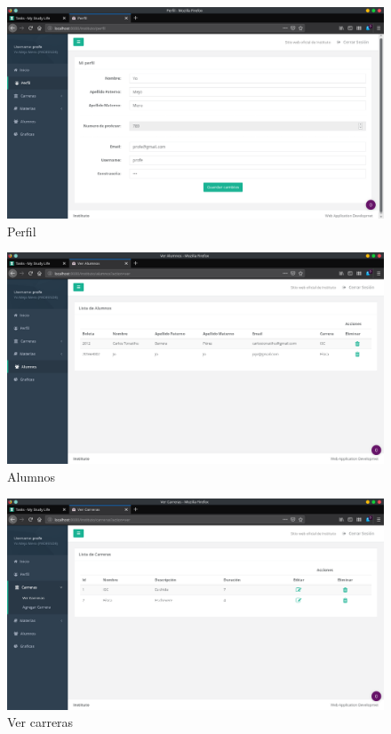 \documentclass[a4paper,12pt]{article}
\begin{document}
\begin{figure}[H]
\begin{center}
 \includegraphics[width=\textwidth]{perfil.png}
 \caption{Perfil}
 \label{fig:perfil}
\end{center}
\end{figure}

\begin{figure}[H]
\begin{center}
 \includegraphics[width=\textwidth]{alumnos.png}
 \caption{Alumnos}
 \label{fig:alumnos}
\end{center}
\end{figure}

\begin{figure}[H]
\begin{center}
 \includegraphics[width=\textwidth]{carreas.png}
 \caption{Ver carreras}
 \label{fig:carreas}
\end{center}
\end{figure}
\end{document}
